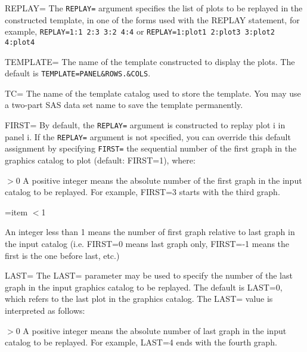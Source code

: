 \begin{proglist}
\item[REPLAY=]
The \texttt{REPLAY=} argument specifies the list of plots to be replayed
in the constructed template, in one of the forms used with the
 REPLAY statement, for example, \texttt{REPLAY=1:1 2:3 3:2 4:4} 
or \texttt{REPLAY=1:plot1 2:plot3 3:plot2 4:plot4}

\item[TEMPLATE=]
The name of the template constructed to display the plots. The
default is \texttt{TEMPLATE=PANEL\&ROWS.\&COLS}.

\item[TC=]
The name of the template catalog used to store the template.
You may use a two-part SAS data set name to save the template
permanently.

\item[FIRST=]
By default, the \texttt{REPLAY=} argument is constructed to replay plot
i in panel i.  If the \texttt{REPLAY=} argument is not specified, you can
override this default assignment by specifying \texttt{FIRST=} the sequential
number of the first graph in the graphics catalog to plot (default:
FIRST=1), where:                       

\begin{proglist}

\item[$>$0]
A positive integer means the absolute number of the first graph in the input catalog to be
replayed.  For example, FIRST=3 starts with the third graph.
      
=item $<$1 

An integer less than 1 means the number of first graph relative to last
graph in the input catalog (i.e. FIRST=0 means 
last graph only, FIRST=-1 means the first is the one before last, etc.) 

\end{proglist}

\item[LAST=]
The LAST= parameter may be used to specify the number of the last graph
in the input graphics catalog to be replayed.  The default is LAST=0,
which refers to the last plot in the graphics catalog.  The LAST= value
is interpreted as follows:

\begin{proglist}

\item[$>$0]
A positive integer means the absolute number of last graph in the input catalog to be
replayed.  For example, LAST=4 ends with the fourth graph.


\end{proglist}
\end{proglist}
